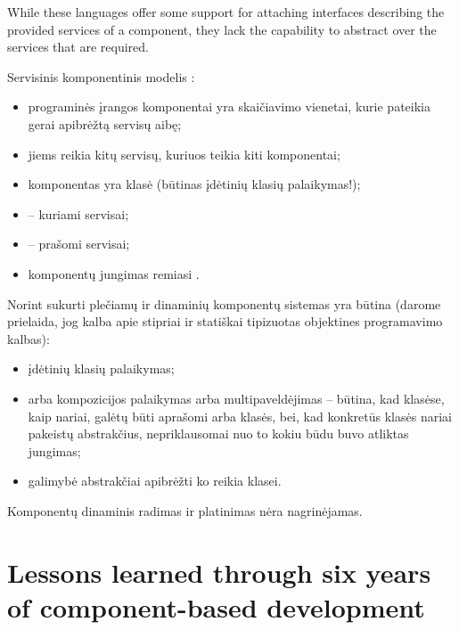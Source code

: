 \begin{note}
  While these languages offer some support for attaching interfaces
  describing the provided services of a component, they lack the
  capability to abstract over the services that are required.
  \cite[1]{scalable-component-abstractions}
\end{note}

Servisinis komponentinis modelis :
\begin{itemize}
  \item programinės įrangos komponentai yra skaičiavimo vienetai, kurie
    pateikia gerai apibrėžtą servisų aibę;
  \item jiems reikia kitų servisų, kuriuos teikia kiti komponentai;
  \item komponentas yra klasė (būtinas įdėtinių klasių palaikymas!);
  \item {} – kuriami servisai;
  \item {} – prašomi servisai;
  \item komponentų jungimas remiasi .
\end{itemize}

Norint sukurti plečiamų  ir dinaminių  komponentų
sistemas yra būtina (darome prielaida, jog kalba apie stipriai
 ir statiškai  tipizuotas objektines
programavimo kalbas):
\begin{itemize}
  \item įdėtinių  klasių palaikymas;
  \item {} arba  kompozicijos palaikymas arba
    multipaveldėjimas – būtina, kad klasėse, kaip nariai, galėtų
    būti aprašomi  arba klasės, bei, kad konkretūs klasės
    nariai pakeistų abstrakčius, nepriklausomai nuo to kokiu būdu
    buvo atliktas jungimas;
  \item galimybė abstrakčiai apibrėžti ko reikia klasei.
\end{itemize}

\begin{note}
  Komponentų dinaminis radimas ir platinimas nėra nagrinėjamas.
\end{note}

\section{Lessons learned through six years of component-based development}

